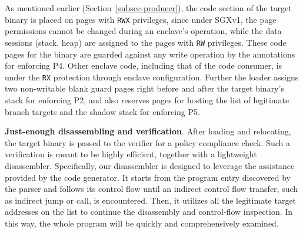 As mentioned earlier (Section~\ref{subsec-producer}), the code section of the target binary is placed on pages with \texttt{RWX} privileges, since under SGXv1, the page permissions cannot be changed during an enclave's operation, while the data sessions (stack, heap) are assigned to the pages with \texttt{RW} privileges. These code pages for the binary are guarded against any write operation by the annotations for enforcing P4. Other enclave code, including that of the code consumer, is under the \texttt{RX} protection through enclave configuration. Further the loader assigns two non-writable blank guard pages right before and after the target binary's stack for enforcing P2, and also reserves pages for hosting the list of legitimate branch targets and the shadow stack for enforcing P5. 





\vspace{3pt}\noindent\textbf{Just-enough disassembling and verification}.
\label{subsec-disassembling} After loading and relocating, the target binary is passed to the verifier for a policy compliance check. Such a verification is meant to be highly efficient, together with a lightweight disassembler. Specifically, our disassembler is designed to leverage the assistance provided by the code generator.  It starts from the program entry discovered by the parser and follows its control flow until an indirect control flow transfer, such as indirect jump or call, is encountered. Then, it utilizes all the legitimate target addresses on the list to continue the disassembly and control-flow inspection. In this way, the whole program will be quickly and comprehensively examined.  

